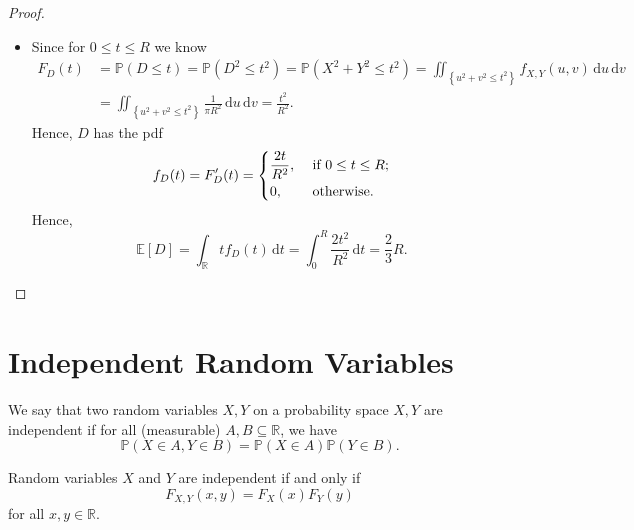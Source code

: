\begin{proof}
\begin{itemize}
\begin{align*}
        \end{align*} 
        Hence, \(X\) has the pdf 
        \[
            f_X(t) = \begin{dcases}
                \frac{2}{\pi R^2} \sqrt{R^2 - t^2} , &\text{ if } t \in [-R, R] ;\\
                0, &\text{ if } t \notin [-R, R]. 
            \end{dcases}
        \] 
        \item [(c)] Since for \(0 \le t \le R\) we know 
        \begin{align*}
            F_D(t) &= \mathbb{P} (D \le t) = \mathbb{P} (D^2 \le t^2) = \mathbb{P} (X^2 + Y^2 \le t^2) = \iint _{\left\{ u^2 + v^2 \le t^2 \right\} } f_{X, Y}(u, v) \, \mathrm{d} u \, \mathrm{d} v \\
            &= \iint_{\left\{ u^2 + v^2 \le t^2 \right\} } \frac{1}{\pi R^2} \, \mathrm{d} u \, \mathrm{d} v = \frac{t^2}{R^2}.    
        \end{align*}
        Hence, \(D\) has the pdf 
        \[
            f_D(t) = F_D^{\prime} (t) = \begin{dcases}
                \frac{2t}{R^2}, &\text{ if } 0 \le t \le R ;\\
                0, &\text{ otherwise}.
            \end{dcases}
        \] 
        Hence,
        \[
            \mathbb{E} [D] = \int_{\mathbb{R} } t f_D(t) \, \mathrm{d} t = \int _0^R \frac{2t^2}{R^2} \, \mathrm{d} t = \frac{2}{3}R.  
        \]
    \end{itemize}
\end{proof}

\section{Independent Random Variables}
\begin{definition}
    We say that two random variables \(X, Y\) on a probability space \(X, Y\) are independent if for all (measurable) \( A, B \subseteq \mathbb{R}\), we have 
    \[
        \mathbb{P} (X \in A, Y \in B) = \mathbb{P} (X \in A) \mathbb{P} (Y \in B).
    \]   
\end{definition}

\begin{proposition}
Random variables \(X\) and \(Y\) are independent if and only if
\[
F_{X,Y}(x,y)=F_X(x)F_Y(y)
\]
for all \(x,y\in \mathbb{R}\).
\end{proposition}

